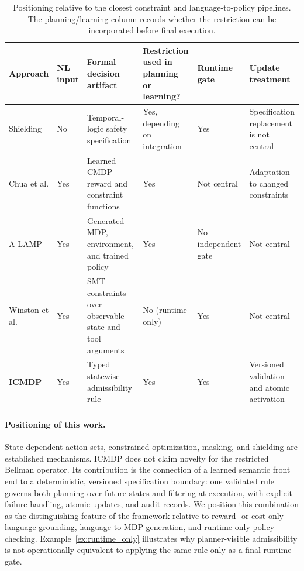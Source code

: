 \documentclass[journal]{IEEEtran}
\theoremstyle{definition}
\begin{document}
\begin{table}[!t]
\centering
\caption{Positioning relative to the closest constraint and
language-to-policy pipelines. The planning/learning column records
whether the restriction can be incorporated before final execution.}
\label{tab:related_positioning}

\scriptsize
\setlength{\tabcolsep}{4pt}
\renewcommand{\arraystretch}{1.15}

\begin{tabular}{
>{\raggedright\arraybackslash}p{2.3cm}
>{\centering\arraybackslash}p{1.4cm}
>{\raggedright\arraybackslash}p{4.0cm}
>{\centering\arraybackslash}p{2.2cm}
>{\centering\arraybackslash}p{1.8cm}
>{\raggedright\arraybackslash}p{3.2cm}
}
\toprule
\textbf{Approach}
&
\textbf{NL input}
&
\textbf{Formal decision artifact}
&
\textbf{Restriction used in planning or learning?}
&
\textbf{Runtime gate}
&
\textbf{Update treatment}
\\
\midrule

Shielding \cite{alshiekh2018shielding}
&
No
&
Temporal-logic safety specification
&
Yes, depending on integration
&
Yes
&
Specification replacement is not central
\\

Chua et al. \cite{chua2025nlconstraints}
&
Yes
&
Learned CMDP reward and constraint functions
&
Yes
&
Not central
&
Adaptation to changed constraints
\\

A-LAMP \cite{jegal2025alamp}
&
Yes
&
Generated MDP, environment, and trained policy
&
Yes
&
No independent gate
&
Not central
\\

Winston et al. \cite{winston2026solver}
&
Yes
&
SMT constraints over observable state and tool arguments
&
No (runtime only)
&
Yes
&
Not central
\\

\textbf{ICMDP}
&
Yes
&
Typed statewise admissibility rule
&
Yes
&
Yes
&
Versioned validation and atomic activation
\\

\bottomrule
\end{tabular}
\end{table}

\FloatBarrier
\paragraph{Positioning of this work.}
State-dependent action sets, constrained optimization, masking, and shielding
are established mechanisms. ICMDP does not claim novelty for the restricted
Bellman operator. Its contribution is the connection of a learned semantic
front end to a deterministic, versioned specification boundary: one validated
rule governs both planning over future states and filtering at execution, with
explicit failure handling, atomic updates, and audit records. We position this
combination as the distinguishing feature of the framework relative to reward-
or cost-only language grounding, language-to-MDP generation, and runtime-only
policy checking. Example~\ref{ex:runtime_only} illustrates why planner-visible
admissibility is not operationally equivalent to applying the same rule only
as a final runtime gate.
\end{document}
